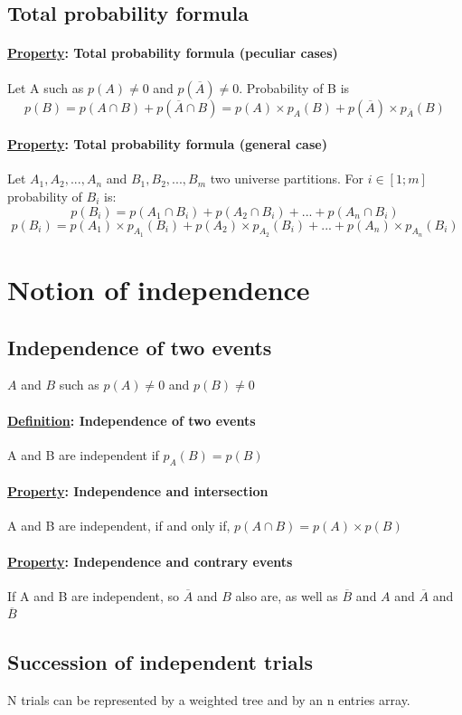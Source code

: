 \documentclass{article}
\newcommand{\definition}[1]{\paragraph*{\underline{Definition}: #1}}
\newcommand{\property}[1]{\paragraph*{\underline{Property}: #1}}
\begin{document}
\subsection{Total probability formula}
\property{Total probability formula (peculiar cases)}
Let A such as $p(A) \ne 0$ and $p(\overline{A}) \ne 0$. Probability of B is $$p(B) = p(A \cap B) + p(\overline{A} \cap B) = p(A) \times p_A(B) + p(\overline{A}) \times p_{\overline{A}}(B)$$
\property{Total probability formula (general case)}
Let $A_1, A_2,...,A_n$ and $B_1, B_2, ...,B_m$ two universe partitions. For $i \in [1;m]$ probability of $B_i$ is:
$$p(B_i) = p(A_1 \cap B_i) + p(A_2 \cap B_i) + ... + p(A_n \cap B_i)$$
$$p(B_i) = p(A_1) \times p_{A_1}(B_i) + p(A_2) \times p_{A_2}(B_i) + ... + p(A_n) \times p_{A_n}(B_i)$$
\section{Notion of independence}
\subsection{Independence of two events}
$A$ and $B$ such as $p(A) \ne 0$ and $p(B) \ne 0$
\definition{Independence of two events}
A and B are independent if $p_A(B) = p(B)$
\property{Independence and intersection}
A and B are independent, if and only if, $p(A \cap B) = p(A) \times p(B)$
\property{Independence and contrary events}
If A and B are independent, so $\overline{A}$ and $B$ also are, as well as $\overline{B}$ and $A$ and $\overline{A}$ and $\overline{B}$
\subsection{Succession of independent trials}
N trials can be represented by a weighted tree and by an n entries array.
\end{document}
